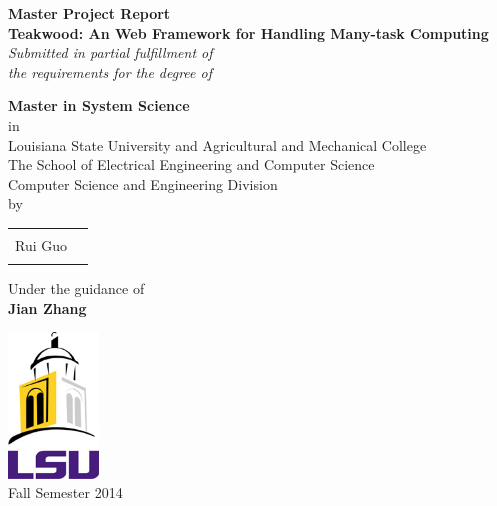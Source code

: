 \begin{titlepage}

\begin{center}

\textup{\bf Master Project Report} \\[0.2in]

\Large \textbf {Teakwood: An Web Framework for Handling Many-task Computing}\\[0.5in]

       \small \emph{Submitted in partial fulfillment of\\
        the requirements for the degree of}
        \vspace{.2in}

       {\bf Master in System Science} \\in\\Louisiana State University and Agricultural and Mechanical College\\ The School of Electrical Engineering and Computer Science\\
Computer Science and Engineering Division\\[0.5in]

\normalsize by \\
\begin{table}[h]
\centering
\begin{tabular}{lr}\hline \\
Rui Guo \\ \\ \hline
 
\end{tabular}
\end{table}

\vspace{.1in}
Under the guidance of\\
{\textbf{Jian Zhang}}\\[0.2in]

\vfill



\includegraphics[width=0.18\textwidth]{./nitc-logo}\\[0.1in]
Fall Semester 2014

\end{center}
\end{titlepage}
